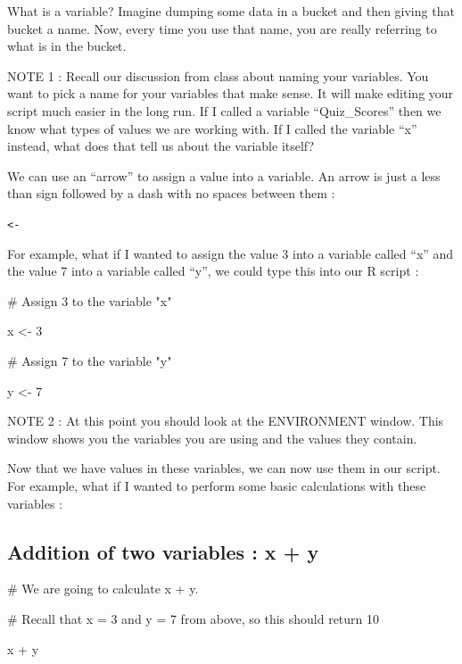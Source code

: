 \documentclass[
  letterpaper,
  DIV=11,
  numbers=noendperiod]{scrreprt}
\newenvironment{Shaded}{\begin{snugshade}}{\end{snugshade}}
\newcommand{\CommentTok}[1]{\textcolor[rgb]{0.37,0.37,0.37}{#1}}
\newcommand{\DecValTok}[1]{\textcolor[rgb]{0.68,0.00,0.00}{#1}}
\newcommand{\NormalTok}[1]{\textcolor[rgb]{0.00,0.23,0.31}{#1}}
\newcommand{\OtherTok}[1]{\textcolor[rgb]{0.00,0.23,0.31}{#1}}
\newcommand{\SpecialCharTok}[1]{\textcolor[rgb]{0.37,0.37,0.37}{#1}}
\begin{document}
What is a variable? Imagine dumping some data in a bucket and then
giving that bucket a name. Now, every time you use that name, you are
really referring to what is in the bucket.

NOTE 1 : Recall our discussion from class about naming your variables.
You want to pick a name for your variables that make sense. It will make
editing your script much easier in the long run. If I called a variable
``Quiz\_Scores'' then we know what types of values we are working with.
If I called the variable ``x'' instead, what does that tell us about the
variable itself?

We can use an ``arrow'' to assign a value into a variable. An arrow is
just a less than sign followed by a dash with no spaces between them :

\texttt{\textless{}-}

For example, what if I wanted to assign the value 3 into a variable
called ``x'' and the value 7 into a variable called ``y'', we could type
this into our R script :

\begin{Shaded}
\begin{Highlighting}[]
\CommentTok{\# Assign 3 to the variable "x"}

\NormalTok{x }\OtherTok{\textless{}{-}} \DecValTok{3}

\CommentTok{\# Assign 7 to the variable "y"}

\NormalTok{y }\OtherTok{\textless{}{-}} \DecValTok{7}
\end{Highlighting}
\end{Shaded}

NOTE 2 : At this point you should look at the ENVIRONMENT window. This
window shows you the variables you are using and the values they
contain.

Now that we have values in these variables, we can now use them in our
script. For example, what if I wanted to perform some basic calculations
with these variables :

\subsection*{Addition of two variables : x +
y}\label{addition-of-two-variables-x-y}

\begin{Shaded}
\begin{Highlighting}[]
\CommentTok{\# We are going to calculate x + y. }

\CommentTok{\# Recall that x = 3 and y = 7 from above, so this should return 10}

\NormalTok{x }\SpecialCharTok{+}\NormalTok{ y}
\end{Highlighting}
\end{Shaded}
\end{document}
